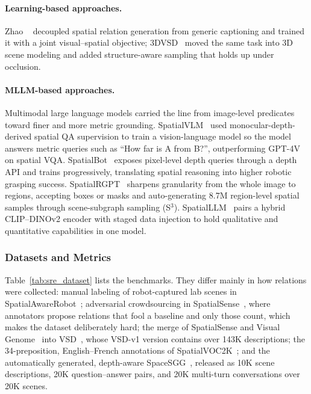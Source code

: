 \paragraph{Learning-based approaches.}
Zhao \etal~\cite{zhao2022visual} decoupled spatial relation generation from generic captioning and trained it with a joint visual--spatial objective; 3DVSD~\cite{zhao2023generating} moved the same task into 3D scene modeling and added structure-aware sampling that holds up under occlusion.

\paragraph{MLLM-based approaches.}
Multimodal large language models carried the line from image-level predicates toward finer and more metric grounding.
SpatialVLM~\cite{chen2024spatialvlm} used monocular-depth-derived spatial QA supervision to train a vision-language model so the model answers metric queries such as ``How far is A from B?'', outperforming GPT-4V on spatial VQA.
SpatialBot~\cite{cai2024spatialbot} exposes pixel-level depth queries through a depth API and trains progressively, translating spatial reasoning into higher robotic grasping success.
SpatialRGPT~\cite{cheng2024spatialrgpt} sharpens granularity from the whole image to regions, accepting boxes or masks and auto-generating 8.7M region-level spatial samples through scene-subgraph sampling (S$^3$).
SpatialLLM~\cite{ma2025spatialllm} pairs a hybrid CLIP--DINOv2 encoder with staged data injection to hold qualitative and quantitative capabilities in one model.


\subsubsection{Datasets and Metrics}
Table~\ref{tab:sre_dataset} lists the benchmarks. They differ mainly in how relations were collected: manual labeling of robot-captured lab scenes in SpatialAwareRobot~\cite{wang2025spatial}; adversarial crowdsourcing in SpatialSense~\cite{yang2019spatialsense}, where annotators propose relations that fool a baseline and only those count, which makes the dataset deliberately hard; the merge of SpatialSense and Visual Genome~\cite{krishna2017visual} into VSD~\cite{zhao2022visual}, whose VSD-v1 version contains over 143K descriptions; the 34-preposition, English--French annotations of SpatialVOC2K~\cite{belz2018spatialvoc2k}; and the automatically generated, depth-aware SpaceSGG~\cite{xu2025llava}, released as 10K scene descriptions, 20K question--answer pairs, and 20K multi-turn conversations over 20K scenes.

